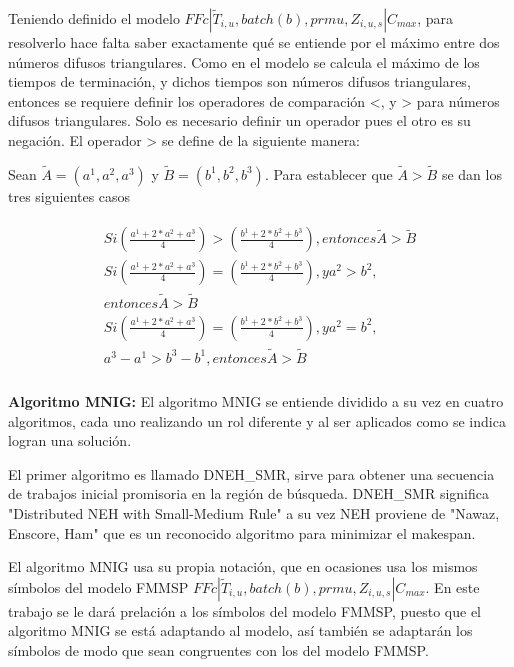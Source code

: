 \documentclass{article}
\def\notac_modelo{$FFc | \tilde{T}_{i, u}, batch(b), prmu, Z_{i, u, s} | C_{max}$}
\begin{document}
\vspace{\baselineskip}
Teniendo definido el modelo \notac_modelo, para resolverlo hace falta saber exactamente qué se entiende por el máximo entre dos números difusos triangulares. Como en el modelo se calcula el máximo de los tiempos de terminación, y dichos tiempos son números difusos triangulares, entonces se requiere definir los operadores de comparación <, y > para números difusos triangulares. Solo es necesario definir un operador pues el otro es su negación. El operador > se define de la siguiente manera: \autocite{modFMMSP}

Sean $\tilde{A} = (a^1,a^2,a^3)$ y $\tilde{B} = (b^1,b^2,b^3)$. Para establecer que $\tilde{A} > \tilde{B}$ se dan los tres siguientes casos

\begin{align}
\begin{split}
    Si \left(\frac{a^1+2*a^2+a^3}{4}\right) > 
    \left(\frac{b^1+2*b^2+b^3}{4}\right), entonces \tilde{A} > \tilde{B}\\
    Si \left(\frac{a^1+2*a^2+a^3}{4}\right) = \left(\frac{b^1+2*b^2+b^3}{4}\right),
    y a^2 > b^2,\\ entonces \tilde{A} > \tilde{B}\\
    Si \left(\frac{a^1+2*a^2+a^3}{4}\right) = \left(\frac{b^1+2*b^2+b^3}{4}\right),
    y a^2 = b^2,\\ a^3-a^1 > b^3-b^1, entonces \tilde{A} > \tilde{B}\\
\end{split}
\end{align}

\vspace{\baselineskip}
\textbf{Algoritmo MNIG:} El algoritmo MNIG se entiende dividido a su vez en cuatro algoritmos, cada uno realizando un rol diferente y al ser aplicados como se indica logran una solución. \autocite{algMNIG}

\vspace{\baselineskip}
El primer algoritmo es llamado DNEH\_SMR, sirve para obtener una secuencia de trabajos inicial promisoria en la región de búsqueda. DNEH\_SMR significa "Distributed NEH with Small-Medium Rule" a su vez NEH proviene de "Nawaz, Enscore, Ham" que es un reconocido algoritmo para minimizar el makespan. \autocite{algMNIG}

\vspace{\baselineskip}
El algoritmo MNIG usa su propia notación, que en ocasiones usa los mismos símbolos del modelo FMMSP \notac_modelo. En este trabajo se le dará prelación a los símbolos del modelo FMMSP, puesto que el algoritmo MNIG se está adaptando al modelo, así también se adaptarán los símbolos de modo que sean congruentes con los del modelo FMMSP.
\end{document}
